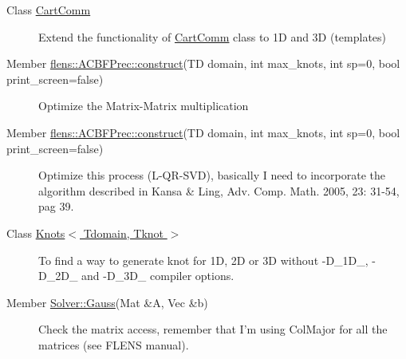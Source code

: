 \label{todo__todo000001}
\hypertarget{todo__todo000001}{}
 \begin{description}
\item[Class \hyperlink{classCartComm}{CartComm} ]Extend the functionality of \hyperlink{classCartComm}{CartComm} class to 1D and 3D (templates)

\end{description}


\label{todo__todo000004}
\hypertarget{todo__todo000004}{}
 \begin{description}
\item[Member \hyperlink{classflens_1_1ACBFPrec_d6f568d64787268a5fb16eed6692f418}{flens::ACBFPrec::construct}(TD domain, int max\_\-knots, int sp=0, bool print\_\-screen=false) ]Optimize the Matrix-Matrix multiplication \end{description}


\label{todo__todo000004}
\hypertarget{todo__todo000004}{}
 \begin{description}
\item[Member \hyperlink{classflens_1_1ACBFPrec_d6f568d64787268a5fb16eed6692f418}{flens::ACBFPrec::construct}(TD domain, int max\_\-knots, int sp=0, bool print\_\-screen=false) ]Optimize this process (L-QR-SVD), basically I need to incorporate the algorithm described in Kansa \& Ling, Adv. Comp. Math. 2005, 23: 31-54, pag 39. \end{description}


\label{todo__todo000002}
\hypertarget{todo__todo000002}{}
 \begin{description}
\item[Class \hyperlink{classKnots}{Knots$<$ Tdomain, Tknot $>$} ]To find a way to generate knot for 1D, 2D or 3D without -D\_\-1D\_\-, -D\_\-2D\_\- and -D\_\-3D\_\- compiler options.

\end{description}


\label{todo__todo000003}
\hypertarget{todo__todo000003}{}
 \begin{description}
\item[Member \hyperlink{namespaceSolver_e7a6d9b74d92a054a16c62b6708d3c88}{Solver::Gauss}(Mat \&A, Vec \&b) ]Check the matrix access, remember that I'm using ColMajor for all the matrices (see FLENS manual). \end{description}
